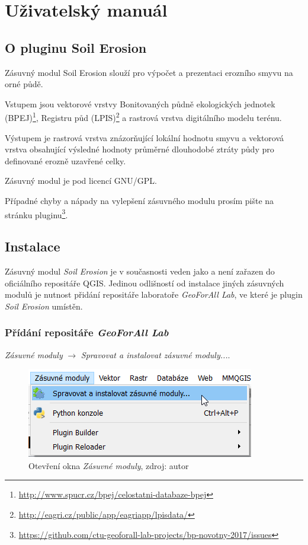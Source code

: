 \chapter{Uživatelský manuál}
\label{6-manual}
\section{O pluginu Soil Erosion}
\label{o_pluginu} Zásuvný modul Soil Erosion slouží pro výpočet a
prezentaci erozního smyvu na orné půdě.

Vstupem jsou vektorové vrstvy Bonitovaných půdně ekologických jednotek
(BPEJ)\footnote{\url{http://www.spucr.cz/bpej/celostatni-databaze-bpej}},
Registru půd
(LPIS)\footnote{\url{http://eagri.cz/public/app/eagriapp/lpisdata/}} a
rastrová vrstva digitálního modelu terénu.

Výstupem je rastrová vrstva znázorňující lokální hodnotu smyvu a
vektorová vrstva obsahující výsledné hodnoty průměrné dlouhodobé
ztráty půdy pro definované erozně uzavřené celky.

Zásuvný modul je pod licencí GNU/GPL.

Případné chyby a nápady na vylepšení zásuvného modulu prosím pište na
stránku
pluginu\footnote{\url{https://github.com/ctu-geoforall-lab-projects/bp-novotny-2017/issues}}.

\section{Instalace}
\label{manual_instalace} Zásuvný modul \textit{Soil Erosion} je v
současnosti veden jako  a není zařazen do
oficiálního repositáře QGIS. Jedinou odlišností od instalace jiných
zásuvných modulů je nutnost přidání repositáře laboratoře
\textit{GeoForAll Lab}, ve které je plugin \textit{Soil Erosion}
umístěn.


\subsection{Přídání repositáře \textit{GeoForAll Lab}} \textit{Zásuvné
moduly} $\rightarrow$ \textit{Spravovat a instalovat zásuvné
moduly...}.

	\begin{figure}[H] \centering
		\includegraphics[width=.6\textwidth]{./pictures/otevreni_okna_zasuvne_moduly.png}
		\caption[Otevření okna \textit{Zásuvné
moduly}]{Otevření okna \textit{Zásuvné moduly}, zdroj: autor}
		\label{fig:manual_otevreni_okna_zasuvne_moduly}
 	\end{figure}
 	
